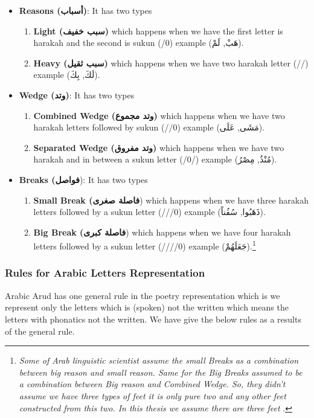 \begin{itemize}
\item \textbf{Reasons (\textarabic{أسباب})}: It has two types
  \begin{enumerate}
  \item \textbf{Light (\textarabic{سبب خفيف})} which happens when we have the first letter is harakah and the second is sukun (/0) example (\textarabic{هَبْ, لَمْ}).
    \item \textbf{Heavy (\textarabic{سبب ثقيل})} which happens when we have two harakah letter (//) example (\textarabic{لَكَ, بِكَ}).
    \end{enumerate}
    \item \textbf{Wedge (\textarabic{وتد})}: It has two types
  \begin{enumerate}
  \item \textbf{Combined Wedge (\textarabic{وتد مجموع})} which happens when we have two harakah letters followed by sukun (//0) example (\textarabic{مَشَى, عَلَى}).
    \item \textbf{Separated Wedge (\textarabic{وتد مفروق})} which happens when we have two harakah and in between a sukun letter (/0/) example (\textarabic{مُنْذُ, مِصْرُ}).
    \end{enumerate}
    \item \textbf{Breaks (\textarabic{فواصل}}): It has two types
  \begin{enumerate}
  \item \textbf{Small Break (\textarabic{فاصلة صغرى}}) which happens when we have three harakah letters followed by a sukun letter (///0) example (\textarabic{ذَهَبُوا, سُفُناً}).
    \item \textbf{Big Break (\textarabic{فاصلة كبرى}}) which happens when we have four harakah letters followed by a sukun letter  (////0) example (\textarabic{جَعَلَهُمْ}).\footnote{\textit{Some of Arab linguistic scientist assume the small Breaks as a combination between big reason and small reason. Same for the Big Breaks assumed to be a combination between Big reason and Combined Wedge. So, they didn't assume we have three types of feet it is only pure two and any other feet constructed from this two. In this thesis we assume there are three feet }.}
    \end{enumerate}
  \end{itemize}


  \subsubsection{Rules for Arabic Letters Representation}
  Arabic Arud has one general rule in the poetry representation which is we represent only the letters which is (spoken) not the written which means the letters with phonatics not the written. We have give the below rules as a results of the general rule.

